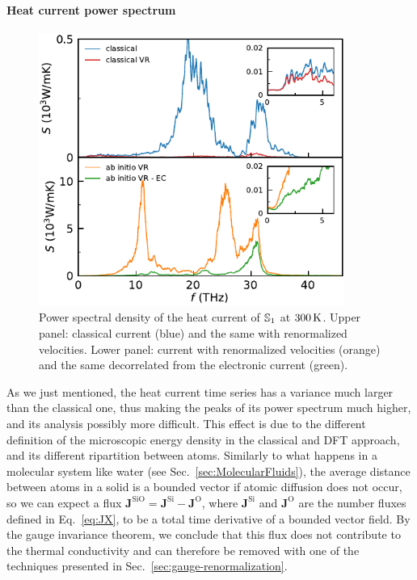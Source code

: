 \paragraph{Heat current power spectrum}
\begin{figure}[!tb]
    \centering
    \includegraphics[width=10cm]{chapters/chapter6/figures/silica_cl-q_psd_cfr.pdf}
    \caption{Power spectral density of the heat current of $\S1$ at $300\,\mathrm{K}$. Upper panel: classical current (blue) and the same with renormalized velocities. Lower panel: \abinitio current with renormalized velocities (orange) and the same decorrelated from the electronic current (green).}
    \label{fig:results-quantum-psd-cfr}
\end{figure}

As we just mentioned, the \abinitio heat current time series has a variance much larger than the classical one, thus making the peaks of its power spectrum much higher, and its analysis possibly more difficult. 
This effect is due to the different definition of the microscopic energy density in the classical and DFT approach, and its different ripartition between atoms. 
Similarly to what happens in a molecular system like water (see Sec.~\ref{sec:MolecularFluids}), the average distance between atoms in a solid is a bounded vector if atomic diffusion does not occur, so we can expect a flux $\mathbf{J}^\mathrm{SiO}=\mathbf{J}^\mathrm{Si}-\mathbf{J}^\mathrm{O}$, where $\mathbf{J}^\mathrm{Si}$ and $\mathbf{J}^\mathrm{O}$ are the number fluxes defined in Eq.~\eqref{eq:JX}, to be a total time derivative of a bounded vector field. By the gauge invariance theorem, we conclude that this flux does not contribute to the thermal conductivity and can therefore be removed with one of the techniques presented in Sec.~\ref{sec:gauge-renormalization}. 

